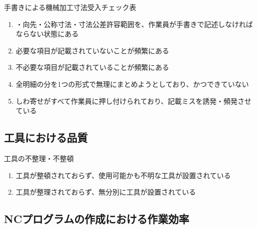 \begin{Issues}{手書きによる機械加工寸法受入チェック表}
\begin{enumerate}[label=\sarrow]
\item[{\sarrow[red]}]\DrawingNumber・向先・公称寸法・寸法公差許容範囲を、作業員が手書きで記述しなければならない状態にある
\item[{\sarrow[red]}]必要な項目が記載されていないことが頻繁にある
\item[{\sarrow[red]}]不必要な項目が記載されていることが頻繁にある
\item[{\sarrow[red]}]全明細の分を1つの形式で無理にまとめようとしており、かつできていない
\item[{\sarrow[red]}]しわ寄せがすべて作業員に押し付けられており、記載ミスを誘発・頻発させている
\end{enumerate}
\end{Issues}


\subsection{工具における品質}

\begin{Issues}{工具の不整理・不整頓}
\begin{enumerate}[label=\sarrow]
\item 工具が整頓されておらず、使用可能かも不明な工具が設置されている
\item 工具が整理されておらず、無分別に工具が設置されている
\end{enumerate}
\end{Issues}



\clearpage


\subsection{NCプログラムの作成における作業効率}

